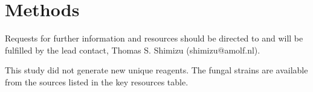 
\providecommand{\todo}[1]{{\color{red}[TODO: #1]}}

\section*{Methods}


Requests for further information and resources should be directed to and will be fulfilled by the lead contact, Thomas S. Shimizu (shimizu@amolf.nl).

This study did not generate new unique reagents.
The fungal strains are available from the sources listed in the key resources table.

